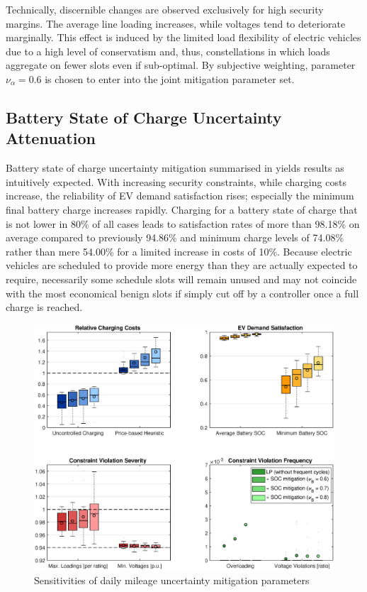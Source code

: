 Technically, discernible changes are observed exclusively for high security margins. The average line loading increases, while voltages tend to deteriorate marginally. This effect is induced by the limited load flexibility of electric vehicles due to a high level of conservatism and, thus, constellations in which loads aggregate on fewer slots even if sub-optimal. By subjective weighting, parameter $\nu_{\alpha}=0.6$ is chosen to enter into the joint mitigation parameter set.

\subsection{Battery State of Charge Uncertainty Attenuation}

Battery state of charge uncertainty mitigation summarised in  yields results as intuitively expected. With increasing security constraints, while charging costs increase, the reliability of EV demand satisfaction rises; especially the minimum final battery charge increases rapidly. Charging for a battery state of charge that is not lower in 80\% of all cases leads to satisfaction rates of more than 98.18\% on average compared to previously 94.86\% and minimum charge levels of 74.08\% rather than mere 54.00\% for a limited increase in costs of 10\%. Because electric vehicles are scheduled to provide more energy than they are actually expected to require, necessarily some schedule slots will remain unused and may not coincide with the most economical benign slots if simply cut off by a controller once a full charge is reached.

\begin{figure}[]
	\centering
	\includegraphics[width=.98\textwidth,trim={2.9cm 1.7cm 2.5cm 0.9cm},clip]{figures/evaluation/lp_soc.eps}
	\caption{Sensitivities of daily mileage uncertainty mitigation parameters}
	\label{fig:lpsoc}
\end{figure}

